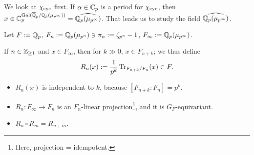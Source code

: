 We look at $\chi_{\mathrm{cyc}}$ first.
If $\alpha\in\mathbb{C}_p$ is a period for $\chi_{\mathrm{cyc}}$,
then $x\in \mathbb{C}_p^{\operatorname{Gal}(\overline{\mathbb{Q}}_p/\mathbb{Q}_p(\mu_{p^\infty}))} = \widehat{\mathbb{Q}_p(\mu_{p^\infty})}$.
That leads us to study the field $\widehat{\mathbb{Q}_p(\mu_{p^\infty})}$.

Let $F := \mathbb{Q}_p$,
$F_n := \mathbb{Q}_p(\mu_{p^n})\ni \pi_n := \zeta_{p^n} - 1$,
$F_\infty := \mathbb{Q}_p(\mu_{p^\infty})$.

If $n\in\mathbb{Z}_{\ge 1}$ and $x\in F_\infty$, then for $k\gg 0$,
$x\in F_{n+k}$;
we thus define \[R_n(x) := \frac{1}{p^k }\operatorname{Tr}_{F_{n+k}/F_n}(x)\in F.\]
\begin{itemize}
\item $R_n(x)$ is independent to $k$, bacause $[F_{n+k} : F_n] = p^k$.
\item $R_n : F_\infty\to F_n$ is an $F_n$-linear projection\footnote{Here, projection = idempotent.}, and it is $G_F$-equivariant.
\item $R_n\circ R_m = R_{n + m}$.
\end{itemize}

